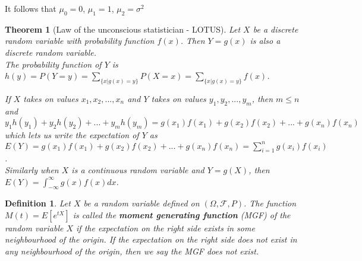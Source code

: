 \documentclass[12pt,twoside]{report}
\theoremstyle{thmstyle}
\newtheorem{defn}{Definition}
\newtheorem{thm}{Theorem}
\begin{document}
It follows that $\mu_0 = 0$, $\mu_1 = 1$, $\mu_2 = \sigma ^2$

\begin{samepage}
\begin{thm}[Law of the unconscious statistician - LOTUS]
    Let $X$ be a discrete random variable with probability function $f(x)$. Then $Y = g(x)$ is also a discrete random variable. \\ The probability function of $Y$ is $h(y) = P(Y = y) = \sum_{ \{x | g(x) = y \} } P(X = x) = \sum_{ \{x | g(x) = y \} } f(x)$.

    If $X$ takes on values $x_1, x_2, ..., x_n$  and $Y$ takes on values $y_1, y_2, ..., y_m$, then $m \leq n$ and $y_1 h(y_1) + y_2 h(y_2) + ... + y_m h(y_m) = g(x_1) f(x_1) + g(x_2) f(x_2) + ... + g(x_n) f(x_n)$ which lets us write the expectation of $Y$ as \\ $E(Y) = g(x_1)f(x_1) + g(x_2)f(x_2) + ... + g(x_n)f(x_n) = \sum_{i=1}^n g(x_i)f(x_i)$.
    \\ 

    Similarly when $X$ is a continuous random variable and $Y=g(X)$, then $E(Y) = \int_{- \infty}^{\infty} g(x) f(x) dx$.
\end{thm}
\end{samepage}

\begin{defn}
    Let $X$ be a random variable defined on $\left (\Omega,  \mathcal{F}, P\right )$. The function $M\left (t\right ) = E\left [e ^{t X}\right ]$ is called the \textbf{moment generating function} (MGF) of the random variable $X$ if the expectation on the right side exists in some neighbourhood of the origin. If the expectation on the right side does not exist in any neighbourhood of the origin, then we say the MGF does not exist.
\end{defn}
\end{document}
